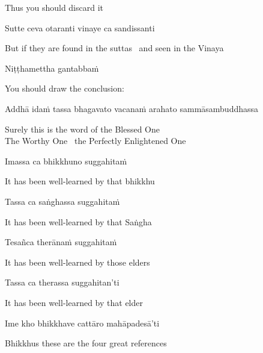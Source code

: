\begin{cprenglish}
  Thus you should discard it
\end{cprenglish}

Sutte ceva otaranti vinaye ca sandissanti

\begin{cprenglish}
  But if they are found in the suttas \breathmark\ and seen in the Vinaya
\end{cprenglish}

Niṭṭhamettha gantabbaṁ

\begin{cprenglish}
  You should draw the conclusion:
\end{cprenglish}

Addhā idaṁ tassa bhagavato vacanaṁ arahato sammāsambuddhassa

\begin{cprenglish}
  Surely this is the word of the Blessed One\\
  The Worthy One \breathmark\ the Perfectly Enlightened One
\end{cprenglish}

Imassa ca bhikkhuno suggahitaṁ

\begin{cprenglish}
  It has been well-learned by that bhikkhu
\end{cprenglish}

Tassa ca saṅghassa suggahitaṁ

\begin{cprenglish}
  It has been well-learned by that Saṅgha
\end{cprenglish}

Tesañca therānaṁ suggahitaṁ

\begin{cprenglish}
  It has been well-learned by those elders
\end{cprenglish}

Tassa ca therassa suggahitan’ti

\begin{cprenglish}
  It has been well-learned by that elder
\end{cprenglish}

Ime kho bhikkhave cattāro mahāpadesā’ti

\begin{cprenglish}
  Bhikkhus these are the four great references
\end{cprenglish}

\suttaRef{[AN 4.180]}

\clearpage

